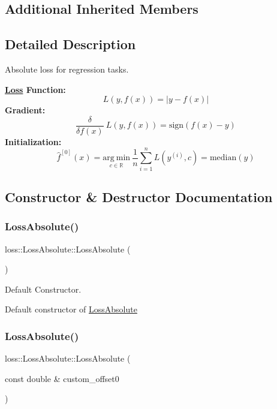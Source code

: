 \subsection*{Additional Inherited Members}


\subsection{Detailed Description}
Absolute loss for regression tasks. 

{\bfseries \hyperlink{classloss_1_1_loss}{Loss} Function\+:} \[ L(y, f(x)) = \left| y - f(x) \right| \] {\bfseries Gradient\+:} \[ \frac{\delta}{\delta f(x)}\ L(y, f(x)) = \mathrm{sign}\left( f(x) - y \right) \] {\bfseries Initialization\+:} \[ \hat{f}^{[0]}(x) = \underset{c\in\mathbb{R}}{\mathrm{arg~min}}\ \frac{1}{n}\sum\limits_{i=1}^n L\left(y^{(i)}, c\right) = \mathrm{median}(y) \] 

\subsection{Constructor \& Destructor Documentation}
\mbox{\label{classloss_1_1_loss_absolute_a7da079d5e12d8970854d10f787fa9602}} 
\subsubsection{\texorpdfstring{Loss\+Absolute()}{LossAbsolute()}\hspace{0.1cm}{\footnotesize\ttfamily [1/2]}}
{\footnotesize\ttfamily loss\+::\+Loss\+Absolute\+::\+Loss\+Absolute (\begin{DoxyParamCaption}{ }\end{DoxyParamCaption})}



Default Constructor. 

Default constructor of {\ttfamily \hyperlink{classloss_1_1_loss_absolute}{Loss\+Absolute}} \mbox{\label{classloss_1_1_loss_absolute_a5b4faa92b976121bcc5cb6938015ac36}} 
\subsubsection{\texorpdfstring{Loss\+Absolute()}{LossAbsolute()}\hspace{0.1cm}{\footnotesize\ttfamily [2/2]}}
{\footnotesize\ttfamily loss\+::\+Loss\+Absolute\+::\+Loss\+Absolute (\begin{DoxyParamCaption}\item[{const double \&}]{custom\+\_\+offset0 }\end{DoxyParamCaption})}



